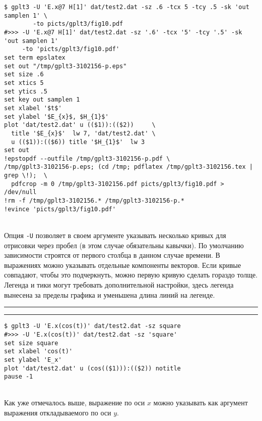 \documentclass[12pt]{article}
\begin{document}
\vspace{3mm}
\noindent
\begin{minipage}[b]{.48\textwidth}
\small
\begin{verbatim}
$ gplt3 -U 'E.x@7 H[1]' dat/test2.dat -sz .6 -tcx 5 -tcy .5 -sk 'out samplen 1' \
        -to picts/gplt3/fig10.pdf
#>>> -U 'E.x@7 H[1]' dat/test2.dat -sz '.6' -tcx '5' -tcy '.5' -sk 'out samplen 1' 
     -to 'picts/gplt3/fig10.pdf'
set term epslatex 
set out "/tmp/gplt3-3102156-p.eps"
set size .6
set xtics 5
set ytics .5
set key out samplen 1
set xlabel '$t$'
set ylabel '$E_{x}$, $H_{1}$'
plot 'dat/test2.dat' u (($1)):(($2))     \
  title '$E_{x}$'  lw 7, 'dat/test2.dat' \
  u (($1)):(($6)) title '$H_{1}$'  lw 3 
set out
!epstopdf --outfile /tmp/gplt3-3102156-p.pdf \
/tmp/gplt3-3102156-p.eps; (cd /tmp; pdflatex /tmp/gplt3-3102156.tex | grep \!);  \
  pdfcrop -m 0 /tmp/gplt3-3102156.pdf picts/gplt3/fig10.pdf > /dev/null
!rm -f /tmp/gplt3-3102156.* /tmp/gplt3-3102156-p.*
!evince 'picts/gplt3/fig10.pdf'
\end{verbatim}
\end{minipage}
\raisebox{2cm}{\epsfig{file=picts/gplt3/fig10, width=.5\textwidth}}\\[5mm]
Опция \verb'-U' позволяет в своем аргументе указывать несколько кривых для отрисовки через пробел (в этом случае обязательны кавычки).
По умолчанию зависимости строятся от первого столбца в данном случае времени. В выражениях можно указывать отдельные компоненты векторов.
Если кривые совпадают, чтобы это подчеркнуть, можно первую кривую сделать гораздо толще.
Легенда и тики могут требовать дополнительной настройки, здесь легенда вынесена за пределы графика и уменьшена длина линий на легенде.\\

\noindent\rule{.45\textwidth}{1pt}\hfill \raisebox{-.45\height}{\bf № 8.}  \hfill\rule{.45\textwidth}{1pt}

\vspace{3mm}
\noindent
\begin{minipage}[b]{.73\textwidth}
\small
\begin{verbatim}
$ gplt3 -U 'E.x(cos(t))' dat/test2.dat -sz square
#>>> -U 'E.x(cos(t))' dat/test2.dat -sz 'square'
set size square
set xlabel 'cos(t)'
set ylabel 'E_x'
plot 'dat/test2.dat' u (cos(($1))):(($2)) notitle   
pause -1
\end{verbatim}
\end{minipage}
\\[5mm]
Как уже отмечалось выше, выражение по оси $x$  можно указывать как аргумент выражения откладываемого по оси $y$.
\end{document}
